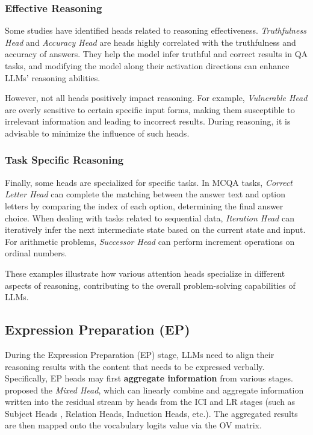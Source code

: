 \documentclass{article}
\begin{document}
\subsubsection{Effective Reasoning} \label{subsubsec:EffectiveReason}
Some studies have identified heads related to reasoning effectiveness. \textit{Truthfulness Head} \citep{ITI_23_NIPS_harvard, NL-ITI_24_arXiv-Samsung} and \textit{Accuracy Head} \citep{CrossLingual_24_SIGIR_UCAS} are heads highly correlated with the truthfulness and accuracy of answers. They help the model infer truthful and correct results in QA tasks, and modifying the model along their activation directions can enhance LLMs' reasoning abilities.

However, not all heads positively impact reasoning. For example, \textit{Vulnerable Head} \citep{VulnerableHead_24_arXiv_Alicante} are overly sensitive to certain specific input forms, making them susceptible to irrelevant information and leading to incorrect results. During reasoning, it is advisable to minimize the influence of such heads.

\subsubsection{Task Specific Reasoning} \label{subsubsec:TaskSpecific}
Finally, some heads are specialized for specific tasks.
In MCQA tasks, \textit{Correct Letter Head} \citep{CorrectLetterHead_23_arXiv_DeepMind} can complete the matching between the answer text and option letters by comparing the index of each option, determining the final answer choice.
When dealing with tasks related to sequential data, \textit{Iteration Head} \citep{IterationHead_24_arXiv_Meta} can iteratively infer the next intermediate state based on the current state and input.
For arithmetic problems, \textit{Successor Head} \citep{SuccessorHead_24_ICLR_Cambridge} can perform increment operations on ordinal numbers.

These examples illustrate how various attention heads specialize in different aspects of reasoning, contributing to the overall problem-solving capabilities of LLMs.


\subsection{Expression Preparation (EP)} \label{subsec:EP}
During the Expression Preparation (EP) stage, LLMs need to align their reasoning results with the content that needs to be expressed verbally. Specifically, EP heads may first \textbf{aggregate information} from various stages.
\citet{FactualRecall_24_arXiv_Independent} proposed the \textit{Mixed Head}, which can linearly combine and aggregate information written into the residual stream by heads from the ICI and LR stages (such as Subject Heads , Relation Heads, Induction Heads, etc.). The aggregated results are then mapped onto the vocabulary logits value via the OV matrix.
\end{document}
